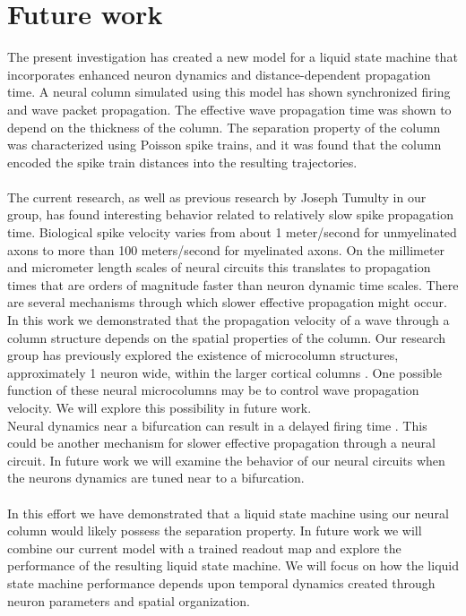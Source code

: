 \documentclass[a4paper,11pt]{article}
\begin{document}
\section{Future work}
The present investigation has created a new model for a liquid state machine that incorporates enhanced neuron dynamics and distance-dependent propagation time.
A neural column simulated using this model has shown synchronized firing and wave packet propagation.
The effective wave propagation time was shown to depend on the thickness of the column.
The separation property of the column was characterized using Poisson spike trains, and it was found that the column encoded the spike train distances into the resulting trajectories.
\\ \\
The current research, as well as previous research by Joseph Tumulty in our group, has found interesting behavior related to relatively slow spike propagation time.
Biological spike velocity varies from about 1 meter/second for unmyelinated axons to  more than 100 meters/second for myelinated axons.
On the millimeter and micrometer length scales of neural circuits this translates to propagation times that are orders of magnitude faster than neuron dynamic time scales.
There are several mechanisms through which slower effective propagation might occur.
\\
In this work we demonstrated that the propagation velocity of a wave through a column structure depends on the spatial properties of the column.
Our research group has previously explored the existence of microcolumn structures, approximately 1 neuron wide, within the larger cortical columns \cite{cruz2000}.
One possible function of these neural microcolumns may be to control wave propagation velocity. 
We will explore this possibility in future work.
\\
Neural dynamics near a bifurcation can result in a delayed firing time \cite{izhikevich}.
This could be another mechanism for slower effective propagation through a neural circuit.
In future work we will examine the behavior of our neural circuits when the neurons dynamics are tuned near to a bifurcation.
\\ \\
In this effort we have demonstrated that a liquid state machine using our neural column would likely possess the separation property.
In future work we will combine our current model with a trained readout map and explore the performance of the resulting liquid state machine.
We will focus on how the liquid state machine performance depends upon temporal dynamics created through neuron parameters and spatial organization.
\end{document}
